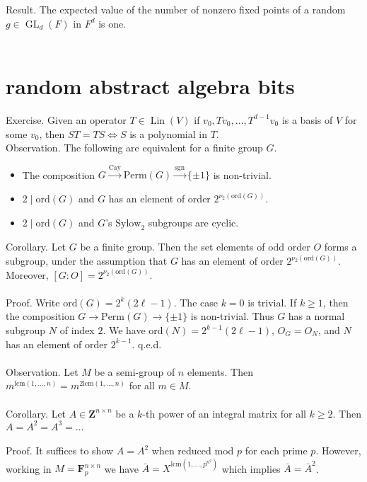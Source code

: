 \documentclass[english]{article}
\renewcommand\to{\longrightarrow}
\def\Z{\mathbf{Z}}
\def\F{\mathbf{F}}
\newcommand\syl[1]{$\text{Sylow}_{#1}$}
\def\ord{\text{ord}}
\def\lcm{\text{lcm}}
\def\perm{\text{Perm}}
\def\cay{\text{Cay}}
\def\sgn{\text{sgn}}
\newcommand\set[1]{\{#1\}}
\DeclareMathOperator\Lin{Lin}
\DeclareMathOperator\GL{GL}
\begin{document}
Result. The expected value of the number of nonzero fixed points of a random $g\in \GL_d(F)$ in $F^d$ is one.\\\\	%




\section*{random abstract algebra bits}


Exercise. Given an operator $T\in\Lin(V)$ if $v_0,Tv_0,\dots,T^{d-1}v_0$ is a basis of $V$ for some $v_0$, then $ST=TS\iff S$ is a polynomial in $T$.\\


Observation. The following are equivalent for a finite group $G$.
\begin{itemize}
\item The composition $G\xrightarrow{\cay}\perm(G)\xrightarrow{\sgn}\{\pm1\}$ is non-trivial.
\item $2\mid \ord(G)$ and $G$ has an element of order $2^{\nu_2(\ord(G))}$.
\item $2\mid \ord(G)$ and $G$'s \syl{2} subgroups are cyclic.
\\
\end{itemize} 
Corollary. Let $G$ be a finite group. Then the set elements of odd order $O$ forms a subgroup, under the assumption that $G$ has an element of order $2^{\nu_2(\ord(G))}$. Moreover, $[G:O]=2^{\nu_2(\ord(G))}$.
\\\\
Proof. Write $\ord(G)=2^k(2\ell-1)$. The case $k=0$ is trivial. If $k\ge1$, then the composition $G\to\perm(G)\to\set{\pm1}$ is non-trivial. Thus $G$ has a normal subgroup $N$ of index $2$. We have $\ord(N)=2^{k-1}(2\ell-1)$, $O_G=O_N$, and $N$ has an element of order $2^{k-1}$. q.e.d.
\\\\
Observation. Let $M$ be a semi-group of $n$ elements. Then $m^{\lcm(1,\dots,n)}=m^{2\lcm(1,\dots,n)}$ for all $m\in M$.
\\\\
Corollary. Let $A\in\Z^{n\times n}$ be a $k$-th power of an integral matrix for all $k\ge 2$. Then $A=A^2=A^3=\dots$
\\\\
Proof. It suffices to show $A=A^2$ when reduced mod $p$ for each prime $p$. However, working in $M=\F_p^{n\times n}$ we have $\bar{A}={X}^{\lcm(1,\dots,p^{n^2})}$ which implies $\bar{A}=\bar{A}^2$.
\\\\
\end{document}
